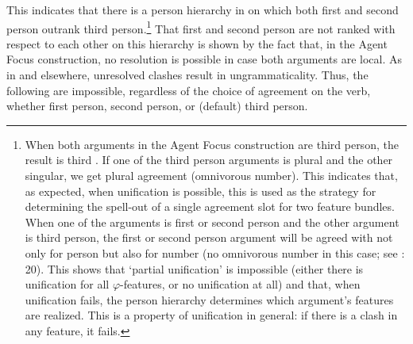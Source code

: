\documentclass[output=paper]{langsci/langscibook}
\begin{document}
This indicates that there is a person hierarchy in  on which both first and second person outrank third person.\footnote{When both arguments in the Agent Focus construction are third person, the result is third . If one of the third person arguments is plural and the other singular, we get plural agreement (omnivorous number). This indicates that, as expected, when unification is possible, this is used as the strategy for determining the spell-out of a single agreement slot for two feature bundles. When one of the arguments is first or second person and the other argument is third person, the first or second person argument will be agreed with not only for person but also for number (no omnivorous number in this case; see \citealt{Preminger2014}: 20). This shows that ‘partial unification’ is impossible (either there is unification for all $\varphi $-features, or no unification at all) and that, when unification fails, the person hierarchy determines which argument’s features are realized. This is a property of unification in general: if there is a clash in any feature, it fails.} That first and second person are not ranked with respect to each other on this hierarchy is shown by the fact that, in the Agent Focus construction, no resolution is possible in case both arguments are local. As in  and elsewhere, unresolved clashes result in ungrammaticality. Thus, the following are impossible, regardless of the choice of agreement on the verb, whether first person, second person, or (default) third person.

\ea 
{}
\z
\z
\end{document}
